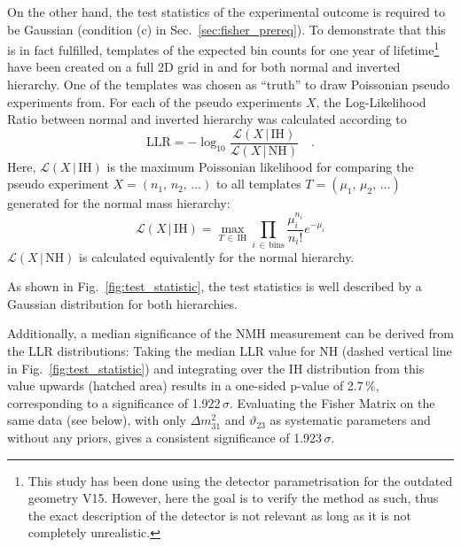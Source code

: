 On the other hand, the test statistics of the experimental outcome is required
to be Gaussian (condition (c) in Sec.~\ref{sec:fisher_prereq}). To demonstrate
that this is in fact fulfilled, templates of the expected bin counts for one
year of lifetime\footnote{This study has been done using the detector
parametrisation for the outdated geometry V15. However, here the goal is to
verify the method as such, thus the exact description of the detector is not
relevant as long as it is not completely unrealistic.} have been created on a
full 2D grid in  and  for both normal and inverted hierarchy.
One of the templates was chosen as ``truth'' to draw Poissonian pseudo
experiments from. For each of the pseudo experiments $X$, the Log-Likelihood
Ratio between normal and inverted hierarchy was calculated according to
\begin{equation}
 \mathrm{LLR} =
-\log_{10}\frac{\mathcal{L}(X\,|\,\mathrm{IH})}{\mathcal{L}(X\,|\,\mathrm{NH})}
 \quad .
 \label{eqn:LLR}
\end{equation}
Here, $\mathcal{L}(X\,|\,\mathrm{IH})$ is the maximum Poissonian likelihood for
comparing the pseudo experiment $X = (n_1,\,n_2,\,\dots)$ to all templates $T
= (\mu_1,\,\mu_2,\,\dots)$ generated for the normal mass hierarchy:
\begin{equation}
 \mathcal{L}(X\,|\,\mathrm{IH}) = \max_{T\,\in\,\mathrm{IH}}
     \prod_{i\,\in\,\mathrm{bins}} \frac{\mu_i^{n_i}}{n_i !} e^{-\mu_i}
\end{equation}
$\mathcal{L}(X\,|\,\mathrm{NH})$ is calculated equivalently for the normal
hierarchy.

As shown in Fig.~\ref{fig:test_statistic},
the test statistics is well described by a Gaussian distribution for both
hierarchies.

Additionally, a median significance of the NMH measurement can be derived from
the LLR distributions: Taking the median LLR value for NH (dashed vertical line
in Fig.~\ref{fig:test_statistic}) and integrating over the IH distribution from
this value upwards (hatched area) results in a one-sided p-value of 2.7\,\%,
corresponding to a significance of 1.922\,$\sigma$. Evaluating the Fisher
Matrix on the same data (see below), with only $\Delta m^2_{31}$ and
$\vartheta_{23}$ as systematic parameters and without any priors, gives a
consistent significance of 1.923\,$\sigma$.

